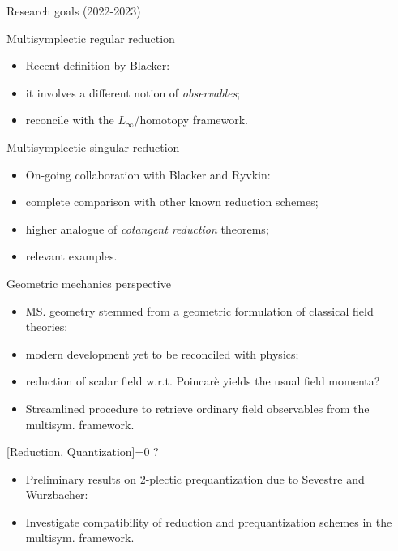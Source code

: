 \documentclass[handout,10pt]{beamer}
\begin{document}
\begin{frame}{Research goals (2022-2023)}
	\begin{probox}[colback=white]{Multisymplectic regular reduction}
		\begin{itemize}
			\item[\cmark] Recent definition by Blacker:
			\item[\smark] it involves a different notion of \emph{observables};
			\item[\smark] reconcile with the $L_\infty$/homotopy framework.
		\end{itemize}
	\end{probox}
	
	\pause
	\begin{probox}[]{Multisymplectic singular reduction}
		\begin{itemize}
			\item[\cmark] On-going collaboration with Blacker and Ryvkin:
			\item[\smark] complete comparison with other known reduction schemes;
			\item[\smark] higher analogue of \emph{cotangent reduction} theorems;
			\item[\smark] relevant examples.
		\end{itemize}
	\end{probox}

 	\pause
	\begin{probox}[colback=white]{Geometric mechanics perspective}
		\begin{itemize}
			\item[\cmark] MS. geometry stemmed from a geometric formulation of classical field theories:
			\item[\smark] modern development yet to be %
			reconciled with physics;
			\item[\smark] reduction of scalar field w.r.t. Poincarè yields the usual field momenta?
			\item[\smark] Streamlined procedure to retrieve ordinary field observables from the multisym. framework.
		\end{itemize}
	\end{probox}  

	\pause
	\begin{probox}[colbacktitle=yellow!15!white ,colback=yellow!15!white]{{[Reduction, Quantization]=0} ?}
		\begin{itemize}
			\item[\cmark] Preliminary results on $2$-plectic prequantization due to Sevestre and Wurzbacher:
			\item[\smark] Investigate compatibility of reduction and prequantization schemes in the multisym. framework.
		\end{itemize}
	\end{probox}	
\end{frame}
\end{document}
